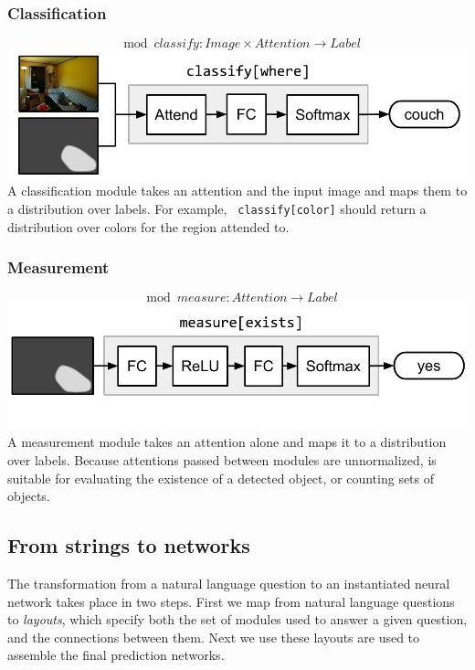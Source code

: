 \subsubsection*{Classification}
\[
  \mod{classify} : \mathit{Image} \times \mathit{Attention} \to
  \mathit{Label}
\]
\includegraphics[width=\columnwidth]{fig/classify}
A classification module  takes an attention and the input
image and maps them to a distribution over labels. For example, {\small\tt
classify[color]} should return a distribution over colors for the region
attended to.\\[1em]

\subsubsection*{Measurement}
\[
  \mod{measure} : \mathit{Attention} \to \mathit{Label}
\]
\includegraphics[width=\columnwidth]{fig/measure}
A measurement module  takes an attention alone and maps it to
a distribution over labels. Because attentions passed between modules are
unnormalized,  is suitable for evaluating the existence of a
detected object, or counting sets of objects.

\subsection{From strings to networks}

The transformation from a natural language question to an instantiated neural
network takes place in two steps.  First we map from natural language questions
to \emph{layouts}, which specify both the set of modules used to answer a given
question, and the connections between them. Next we use these layouts are used
to assemble the final prediction networks.

